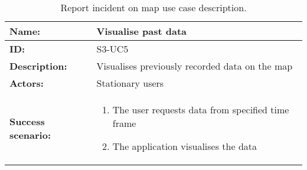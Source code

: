 \begin{table}[htbp]
    \centering
    \begin{tabularx}{\textwidth}{lX}
        \toprule
        \textbf{Name:}  & Visualise past data \\ \midrule
        \textbf{ID:}    & S3-UC5 \\ \midrule
        \textbf{Description:} & Visualises previously recorded data on the map \\ \midrule
        \textbf{Actors:} & Stationary users \\ \midrule
        \textbf{Success scenario:} & 
        \begin{enumerate}
            \item The user requests data from specified time frame
            \item The application visualises the data 
        \end{enumerate}
        \\ \bottomrule
    \end{tabularx}
    \caption{Report incident on map use case description.}
    \label{tab:s3-uc5}
\end{table}